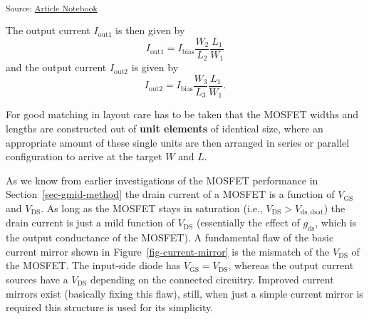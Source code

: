 \documentclass[
  a4paper,
  DIV=11,
  numbers=noendperiod]{scrartcl}
\begin{document}
\textsubscript{Source:
\href{https://iic-jku.github.io/analog-circuit-design/index.qmd.html}{Article
Notebook}}

The output current \(I_\mathrm{out1}\) is then given by \[
I_\mathrm{out1} = I_\mathrm{bias} \frac{W_2}{L_2} \frac{L_1}{W_1}
\] and the output current \(I_\mathrm{out2}\) is given by \[
I_\mathrm{out2} = I_\mathrm{bias} \frac{W_3}{L_3} \frac{L_1}{W_1}.
\]

For good matching in layout care has to be taken that the MOSFET widths
and lengths are constructed out of \textbf{unit elements} of identical
size, where an appropriate amount of these single units are then
arranged in series or parallel configuration to arrive at the target
\(W\) and \(L\).

As we know from earlier investigations of the MOSFET performance in
Section~\ref{sec-gmid-method} the drain current of a MOSFET is a
function of \(V_\mathrm{GS}\) and \(V_\mathrm{DS}\). As long as the
MOSFET stays in saturation (i.e., \(V_\mathrm{DS}> V_\mathrm{ds,dsat}\))
the drain current is just a mild function of \(V_\mathrm{DS}\)
(essentially the effect of \(g_\mathrm{ds}\), which is the output
conductance of the MOSFET). A fundamental flaw of the basic current
mirror shown in Figure~\ref{fig-current-mirror} is the mismatch of the
\(V_\mathrm{DS}\) of the MOSFET. The input-side diode has
\(V_\mathrm{GS}= V_\mathrm{DS}\), whereas the output current sources
have a \(V_\mathrm{DS}\) depending on the connected circuitry. Improved
current mirrors exist (basically fixing this flaw), still, when just a
simple current mirror is required this structure is used for its
simplicity.
\end{document}
